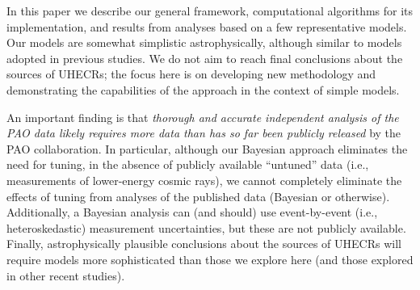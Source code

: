 In this paper we describe our general framework, computational algorithms
for its implementation, and results from analyses based on a few
representative models.  Our models are somewhat simplistic astrophysically,
although similar to models adopted in previous studies.  We do not aim to
reach final conclusions about the sources of UHECRs; the focus here is on
developing new methodology and demonstrating the capabilities of the
approach in the context of simple models.

An important finding is that {\em thorough and accurate independent analysis
of the PAO data likely requires more data than has so far been publicly
released} by the PAO collaboration.  In particular, although our Bayesian
approach eliminates the need for tuning, in the absence of publicly available
``untuned'' data (i.e., measurements of lower-energy cosmic rays), we cannot
completely eliminate the effects of tuning from analyses of the
published data (Bayesian or otherwise).  Additionally, a Bayesian analysis can
(and should) use event-by-event (i.e., heteroskedastic) measurement
uncertainties, but these are not publicly available.  Finally, astrophysically
plausible conclusions about the sources of UHECRs will require models more
sophisticated than those we explore here (and those explored in other recent
studies).
